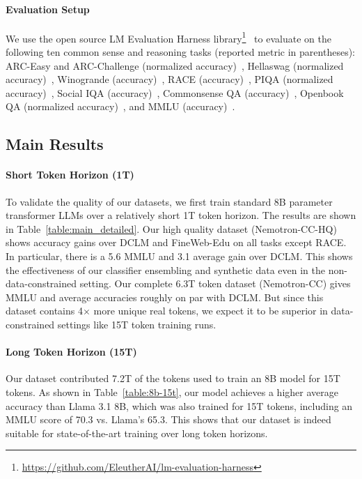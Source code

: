 \documentclass[11pt]{article}
\newcommand{\DCLM}{\textsc{DCLM}\xspace}
\newcommand{\Ours}{Nemotron-CC\xspace}
\begin{document}
\paragraph{Evaluation Setup} We use the open source LM Evaluation Harness library\footnote{\url{https://github.com/EleutherAI/lm-evaluation-harness}}~\citep{eval-harness} to evaluate on the following ten common sense and reasoning tasks (reported metric in parentheses): ARC-Easy and ARC-Challenge (normalized accuracy)~\citep{clark2018think}, Hellaswag (normalized accuracy)~\citep{zellers2019hellaswag}, Winogrande (accuracy)~\citep{sakaguchi2021winogrande}, RACE (accuracy)~\citep{lai2017race}, PIQA (normalized accuracy)~\citep{bisk2020piqa}, Social IQA (accuracy)~\citep{sap2019social}, Commonsense QA (accuracy)~\citep{talmor2019commonsenseqa}, Openbook QA (normalized accuracy)~\citep{mihaylov2018can}, and MMLU (accuracy)~\citep{hendrycks2021measuring}.

\subsection{Main Results}



\paragraph{Short Token Horizon (1T)}

To validate the quality of our datasets, we first train standard 8B parameter transformer LLMs over a relatively short 1T token horizon. The results are shown in Table~\ref{table:main_detailed}. Our high quality dataset (\Ours-HQ) shows accuracy gains over \DCLM and FineWeb-Edu on all tasks except RACE. In particular, there is a 5.6 MMLU and 3.1 average gain over \DCLM. This shows the effectiveness of our classifier ensembling and synthetic data even in the non-data-constrained setting. Our complete 6.3T token dataset (\Ours) gives MMLU and average accuracies roughly on par with \DCLM. But since this dataset contains 4$\times$ more unique real tokens, we expect it to be superior in data-constrained settings like 15T token training runs.

\paragraph{Long Token Horizon (15T)}


Our dataset contributed 7.2T of the tokens used to train an 8B model for 15T tokens.
As shown in Table~\ref{table:8b-15t}, our model achieves a higher average accuracy than Llama 3.1 8B, which was also trained for 15T tokens, including an MMLU score of 70.3 vs. Llama's 65.3. This shows that our dataset is indeed suitable for state-of-the-art training over long token horizons.
\end{document}
